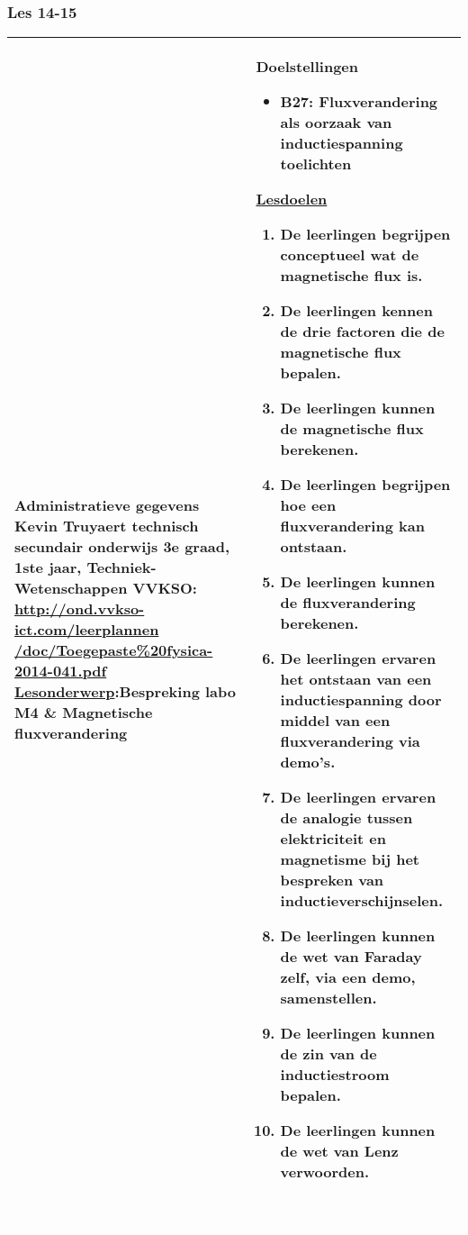 


\begin{landscape}
	\subsubsection{Les 14-15}
	\begin{tabularx}{1.56\textwidth}{|p{}|X|}\hline
		\textbf{Administratieve gegevens}\newline\newline
		Kevin Truyaert\newline\newline
		technisch secundair onderwijs\newline
		3e graad, 1ste jaar, Techniek-Wetenschappen\newline
		VVKSO: \href{http://ond.vvkso-ict.com/leerplannen/doc/Toegepaste\%20fysica-2014-041.pdf}{http://ond.vvkso-ict.com/leerplannen /doc/Toegepaste\%20fysica-2014-041.pdf} \newline
		\underline{Lesonderwerp}:\newline Bespreking labo M4 \& Magnetische fluxverandering & \textbf{Doelstellingen}
		\begin{itemize}[itemsep=0.08\baselineskip]
			\item B27: Fluxverandering als oorzaak van inductiespanning toelichten
		\end{itemize}
		\underline{Lesdoelen}\newline
		\vspace{-0.75cm}
		\begin{enumerate}[itemsep=0.08\baselineskip]
			\item De leerlingen begrijpen conceptueel wat de magnetische flux is.
			\item De leerlingen kennen de drie factoren die de magnetische flux bepalen.
			\item De leerlingen kunnen de magnetische flux berekenen.
			\item De leerlingen begrijpen hoe een fluxverandering kan ontstaan.
			\item De leerlingen kunnen de fluxverandering berekenen.
			\item De leerlingen ervaren het ontstaan van een inductiespanning door middel van een fluxverandering via demo's.
			\item De leerlingen ervaren de analogie tussen elektriciteit en magnetisme bij het bespreken van inductieverschijnselen.
			\item De leerlingen kunnen de wet van Faraday zelf, via een demo, samenstellen.
			\item De leerlingen kunnen de zin van de inductiestroom bepalen.
			\item De leerlingen kunnen de wet van Lenz verwoorden.
		\end{enumerate} \\\hline
	\end{tabularx}\vfill \textcolor{white}{.} 



\end{landscape}

